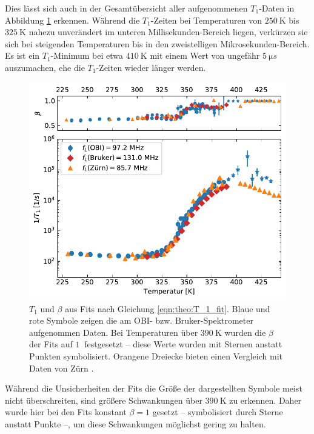 Dies lässt sich auch in der Gesamtübersicht aller aufgenommenen $T_1$-Daten in Abbildung \ref{fig:res:T_1} erkennen. Während die $T_1$-Zeiten bei Temperaturen von $\SI{250}{\kelvin}$ bis $\SI{325}{\kelvin}$ nahezu unverändert im unteren Millisekunden-Bereich liegen, verkürzen sie sich bei steigenden Temperaturen bis in den zweistelligen Mikrosekunden-Bereich. Es ist ein $T_1$-Minimum bei etwa $\SI{410}{\kelvin}$ mit einem Wert von ungefähr $\SI{5}{\micro s}$ auszumachen, ehe die $T_1$-Zeiten wieder länger werden.
\begin{figure}
	\begin{center}
		\includegraphics[width=\textwidth]{graphics/plot/t1.pdf}
	\end{center}
	\caption{$T_1$ und $\beta$ aus Fits nach Gleichung \eqref{eqn:theo:T_1_fit}. Blaue und rote Symbole zeigen die am OBI- bzw. Bruker-Spektrometer aufgenommen Daten. Bei Temperaturen über $\SI{390}{\kelvin}$ wurden die $\beta$ der Fits auf $\SI{1}{}$ festgesetzt -- diese Werte wurden mit Sternen anstatt Punkten symbolisiert. Orangene Dreiecke bieten einen Vergleich mit Daten von Zürn \cite{zuern_paper}.} \label{fig:res:T_1}
\end{figure}

Während die Unsicherheiten der Fits die Größe der dargestellten Symbole meist nicht überschreiten, sind größere Schwankungen über $\SI{390}{\kelvin}$ zu erkennen. Daher wurde hier bei den Fits konstant $\beta = 1$ gesetzt -- symbolisiert durch Sterne anstatt Punkte --, um diese Schwankungen möglichst gering zu halten.

